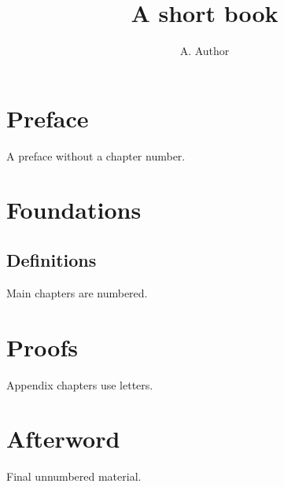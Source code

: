 \documentclass[11pt,a4paper,oneside,openany]{book}
\begin{document}
\frontmatter
\title{A short book}\author{A. Author}\date{}\maketitle
\tableofcontents\chapter{Preface}A preface without a chapter number.
\mainmatter\chapter{Foundations}\section{Definitions}Main chapters are numbered.
\appendix\chapter{Proofs}Appendix chapters use letters.
\backmatter\chapter{Afterword}Final unnumbered material.
\end{document}
